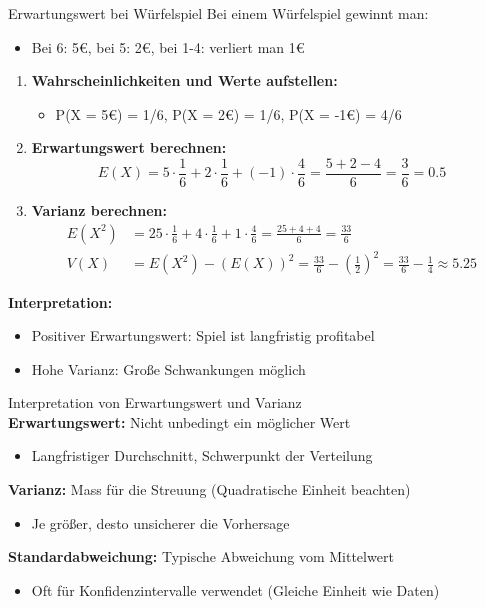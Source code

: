 \begin{example2}{Erwartungswert bei Würfelspiel}
Bei einem Würfelspiel gewinnt man:
\begin{itemize}
\item Bei 6: 5€, bei 5: 2€, bei 1-4: verliert man 1€
\end{itemize}
\vspace{1mm}
\begin{enumerate}
\item \textbf{Wahrscheinlichkeiten und Werte aufstellen:}
   \begin{itemize}
   \item P(X = 5€) = 1/6, P(X = 2€) = 1/6, P(X = -1€) = 4/6
   \end{itemize}

\item \textbf{Erwartungswert berechnen:}
   $$E(X) = 5 \cdot \frac{1}{6} + 2 \cdot \frac{1}{6} + (-1) \cdot \frac{4}{6} = \frac{5+2-4}{6} = \frac{3}{6} = 0.5$$

\item \textbf{Varianz berechnen:}
   \begin{align*}
   E(X^2) &= 25 \cdot \frac{1}{6} + 4 \cdot \frac{1}{6} + 1 \cdot \frac{4}{6} = \frac{25+4+4}{6} = \frac{33}{6} \\
   V(X) &= E(X^2) - (E(X))^2 = \frac{33}{6} - (\frac{1}{2})^2 = \frac{33}{6} - \frac{1}{4} \approx 5.25
   \end{align*}
\end{enumerate}

\textbf{Interpretation:}
\begin{itemize}
\item Positiver Erwartungswert: Spiel ist langfristig profitabel
\item Hohe Varianz: Große Schwankungen möglich
\end{itemize}
\end{example2}

\begin{KR}{Interpretation von Erwartungswert und Varianz}\\
\textbf{Erwartungswert:} Nicht unbedingt ein möglicher Wert
   \begin{itemize}
   \item Langfristiger Durchschnitt, Schwerpunkt der Verteilung
   \end{itemize}

\textbf{Varianz:} Mass für die Streuung (Quadratische Einheit beachten)
   \begin{itemize}
   \item Je größer, desto unsicherer die Vorhersage
   \end{itemize}

\textbf{Standardabweichung:} Typische Abweichung vom Mittelwert 
   \begin{itemize}
   \item Oft für Konfidenzintervalle verwendet (Gleiche Einheit wie Daten)
   \end{itemize}
\end{KR}


